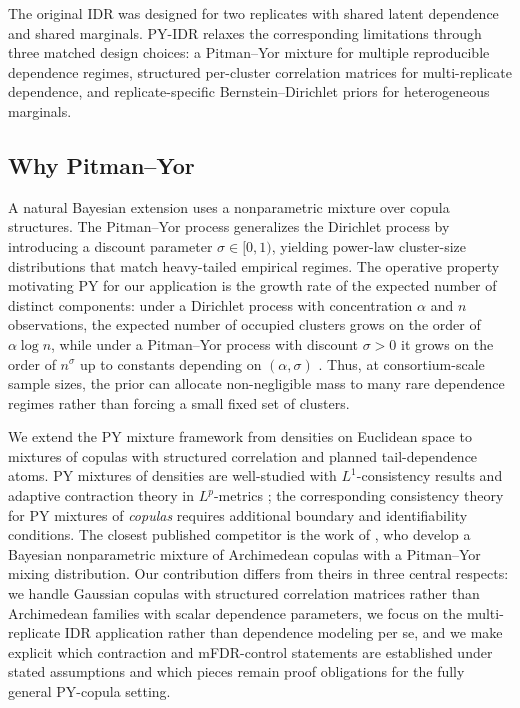 \begin{takeawaybox}
The original IDR was designed for two replicates with shared latent dependence and shared marginals. PY-IDR relaxes the corresponding limitations through three matched design choices: a Pitman--Yor mixture for multiple reproducible dependence regimes, structured per-cluster correlation matrices for multi-replicate dependence, and replicate-specific Bernstein--Dirichlet priors for heterogeneous marginals.
\end{takeawaybox}

\subsection{Why Pitman--Yor}

A natural Bayesian extension uses a nonparametric mixture over copula structures. The Pitman--Yor process \citep{PitmanYor1997} generalizes the Dirichlet process by introducing a discount parameter $\sigma \in [0,1)$, yielding power-law cluster-size distributions that match heavy-tailed empirical regimes. The operative property motivating PY for our application is the growth rate of the expected number of distinct components: under a Dirichlet process with concentration $\alpha$ and $n$ observations, the expected number of occupied clusters grows on the order of $\alpha \log n$, while under a Pitman--Yor process with discount $\sigma > 0$ it grows on the order of $n^\sigma$ up to constants depending on $(\alpha,\sigma)$ \citep{PitmanYor1997}. Thus, at consortium-scale sample sizes, the prior can allocate non-negligible mass to many rare dependence regimes rather than forcing a small fixed set of clusters.

We extend the PY mixture framework from densities on Euclidean space to mixtures of copulas with structured correlation and planned tail-dependence atoms. PY mixtures of densities are well-studied with $L^1$-consistency results \citep{IshwaranJames2001,WuGhosal2010} and adaptive contraction theory in $L^p$-metrics \citep{Scricciolo2014BAPY}; the corresponding consistency theory for PY mixtures of \emph{copulas} requires additional boundary and identifiability conditions. The closest published competitor is the work of \citet{PanNietoBarajasCraiu2024}, who develop a Bayesian nonparametric mixture of Archimedean copulas with a Pitman--Yor mixing distribution. Our contribution differs from theirs in three central respects: we handle Gaussian copulas with structured correlation matrices rather than Archimedean families with scalar dependence parameters, we focus on the multi-replicate IDR application rather than dependence modeling per se, and we make explicit which contraction and mFDR-control statements are established under stated assumptions and which pieces remain proof obligations for the fully general PY-copula setting.

